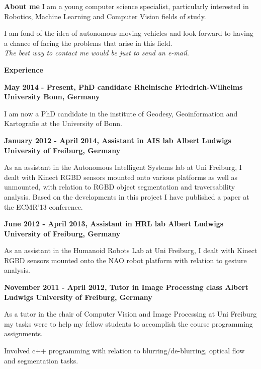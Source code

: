 \documentclass[a4paper,12pt,final]{memoir}
\newcommand{\Sep}{\vspace{1.5em}}
\newcommand{\SmallSep}{\vspace{0.5em}}
\newenvironment{AboutMe}
	{\ignorespaces\textbf{\color{Black} About me}}
	{\Sep\ignorespacesafterend}
\newcommand{\CVSection}[1]
	{\Large\textbf{#1}\par
	\SmallSep\normalsize\normalfont}
\newcommand{\CVItem}[1]
	{\textbf{\color{MidnightBlue} #1}}
\begin{document}
\normalsize\normalfont

\begin{AboutMe}
\newline
I am a young computer science specialist, particularly interested in Robotics, Machine Learning and Computer Vision fields of study.

I am fond of the idea of autonomous moving vehicles and look forward to having a chance of facing the problems that arise in this field. \\
\emph{The best way to contact me would be just to send an e-mail}.
\end{AboutMe}

\CVSection{Experience}
\CVItem{May 2014 - Present, PhD candidate
\newline Rheinische Friedrich-Wilhelms University Bonn, Germany}
\begin{compactitem}[\color{RoyalBlue}$\circ$]
\item I am now a PhD candidate in the institute of Geodesy, Geoinformation and Kartografie at the University of Bonn.
\end{compactitem}
\SmallSep

\CVItem{January 2012 - April 2014, Assistant in AIS lab
\newline Albert Ludwigs University of Freiburg, Germany}
\begin{compactitem}[\color{RoyalBlue}$\circ$]
\item As an assistant in the Autonomous Intelligent Systems lab at Uni Freiburg, I dealt with Kinect RGBD sensors mounted onto various platforms as well as unmounted, with relation to RGBD object segmentation and traversability analysis. Based on the developments in this project I have published a paper at the ECMR'13 conference.
\end{compactitem}
\SmallSep

\CVItem{June 2012 - April 2013, Assistant in HRL lab
\newline Albert Ludwigs University of Freiburg, Germany}
\begin{compactitem}[\color{RoyalBlue}$\circ$]
	\item As an assistant in the Humanoid Robots Lab at Uni Freiburg, I dealt with Kinect RGBD sensors mounted onto the NAO robot platform with relation to gesture analysis.
\end{compactitem}
\SmallSep

\CVItem{November 2011 - April 2012, Tutor in Image Processing class
\newline Albert Ludwigs University of Freiburg, Germany}
\begin{compactitem}[\color{RoyalBlue}$\circ$]
\item As a tutor in the chair of Computer Vision and Image Processing at Uni Freiburg my tasks were to help my fellow students to accomplish the course programming assignments.
\item Involved c++ programming with relation to blurring/de-blurring, optical flow and segmentation tasks.
\end{compactitem}
\SmallSep
\end{document}
